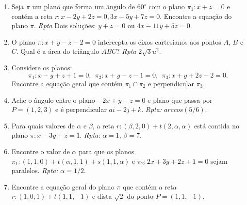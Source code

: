 \documentclass{article}
\theoremstyle{plain}
\theoremstyle{definition}
\theoremstyle{remark}
\begin{document}
\begin{enumerate}
      \item Seja $\pi$ um plano que forma 
      um ângulo de $60^{\circ}$ com o plano 
      $\pi_1: x+z=0$ e contém a reta
      $r: x-2y+2z=0, 3x-5y+7z=0$.
      Encontre a equação do plano $\pi$.
      {\it Rpta} Dois soluções: 
      $y+z=0$ ou $4x-11y+5z=0$.      
      \item  O plano $\pi: x+y-z-2=0$ intercepta os 
      eixos cartesianos aos pontos $A$, $B$ e $C$. 
      Qual é a área do triângulo $ABC$? {\it Rpta} $2\sqrt{3} u^2$.
      \item Considere os planos: 
      $$ \pi_1: x-y+z+1=0, \ \ \pi_2: x+y-z-1=0, \ \ 
         \pi_3: x+y+2z-2=0. $$
      Encontre a equação geral que contém $\pi_1\cap \pi_2$ e perpendicular 
      $\pi_3$.   
      \item Ache o ângulo entre o plano $-2x+y-z=0$ e plano que passa por
      $P=(1,2,3)$ e é perpendicular $a i-2j+k$. {\it Rpta:} $arccos(5/6)$.
      \item Para quais valores de $\alpha$ e $\beta$, a reta 
      $r: (\beta, 2, 0)+t(2, \alpha, \alpha)$ está contida no plano 
      $\pi: x-3y+z=1$. {\it Rpta: } $\alpha=1$, $\beta=7$.
      \item Encontre o valor de $\alpha$ para que 
      os planos $\pi_1: (1,1,0)+t(\alpha, 1, 1)+s(1,1, \alpha)$
      e $\pi_2: 2x+3y+2z+1=0$ sejam paralelos. {\it Rpta: }
      $\alpha=1/2$.
      \item Encontre a equação geral do plano 
      $\pi$ que contém a reta $r: (1,0,1)+t(1,1,-1)$ e dista 
      $\sqrt{2}$
      do ponto $P=(1,1,-1)$. 
\end{enumerate}
\end{document}
